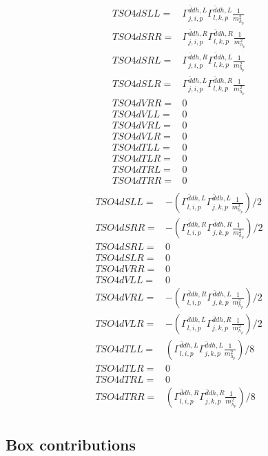 \documentclass[A4,landscape]{article}
\begin{document}
\begin{align} 
  TSO4dSLL= & \Gamma^{\bar{d}d h ,L}_{j, i, p} \Gamma^{\bar{d}d h ,L}_{l, k, p} \frac{1}{m^2_{h_{{p}}}} \\ 
  TSO4dSRR= & \Gamma^{\bar{d}d h ,R}_{j, i, p} \Gamma^{\bar{d}d h ,R}_{l, k, p} \frac{1}{m^2_{h_{{p}}}} \\ 
  TSO4dSRL= & \Gamma^{\bar{d}d h ,R}_{j, i, p} \Gamma^{\bar{d}d h ,L}_{l, k, p} \frac{1}{m^2_{h_{{p}}}} \\ 
  TSO4dSLR= & \Gamma^{\bar{d}d h ,L}_{j, i, p} \Gamma^{\bar{d}d h ,R}_{l, k, p} \frac{1}{m^2_{h_{{p}}}} \\ 
  TSO4dVRR= & 0 \\ 
  TSO4dVLL= & 0 \\ 
  TSO4dVRL= & 0 \\ 
  TSO4dVLR= & 0 \\ 
  TSO4dTLL= & 0 \\ 
  TSO4dTLR= & 0 \\ 
  TSO4dTRL= & 0 \\ 
  TSO4dTRR= & 0 \\ 
\end{align} 
\begin{align} 
  TSO4dSLL= & -(\Gamma^{\bar{d}d h ,L}_{l, i, p} \Gamma^{\bar{d}d h ,L}_{j, k, p} \frac{1}{m^2_{h_{{p}}}})/2 \\ 
  TSO4dSRR= & -(\Gamma^{\bar{d}d h ,R}_{l, i, p} \Gamma^{\bar{d}d h ,R}_{j, k, p} \frac{1}{m^2_{h_{{p}}}})/2 \\ 
  TSO4dSRL= & 0 \\ 
  TSO4dSLR= & 0 \\ 
  TSO4dVRR= & 0 \\ 
  TSO4dVLL= & 0 \\ 
  TSO4dVRL= & -(\Gamma^{\bar{d}d h ,R}_{l, i, p} \Gamma^{\bar{d}d h ,L}_{j, k, p} \frac{1}{m^2_{h_{{p}}}})/2 \\ 
  TSO4dVLR= & -(\Gamma^{\bar{d}d h ,L}_{l, i, p} \Gamma^{\bar{d}d h ,R}_{j, k, p} \frac{1}{m^2_{h_{{p}}}})/2 \\ 
  TSO4dTLL= & (\Gamma^{\bar{d}d h ,L}_{l, i, p} \Gamma^{\bar{d}d h ,L}_{j, k, p} \frac{1}{m^2_{h_{{p}}}})/8 \\ 
  TSO4dTLR= & 0 \\ 
  TSO4dTRL= & 0 \\ 
  TSO4dTRR= & (\Gamma^{\bar{d}d h ,R}_{l, i, p} \Gamma^{\bar{d}d h ,R}_{j, k, p} \frac{1}{m^2_{h_{{p}}}})/8 \\ 
\end{align} 
\subsection{Box contributions} 
\end{document}

